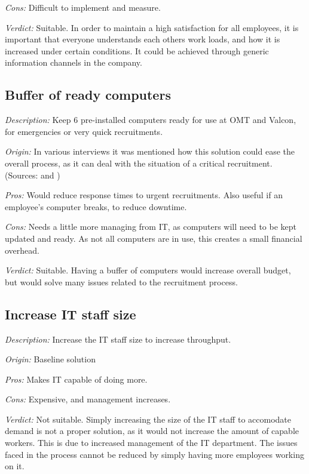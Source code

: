 \noindent \emph{Cons:} Difficult to implement and measure. 

\emph{Verdict:}
Suitable. In order to maintain a high satisfaction for all employees, it is important that everyone understands each others work loads, and how it is increased under certain conditions. It could be achieved through generic information channels in the company.

\subsection{Buffer of ready computers}
\emph{Description:} Keep 6 pre-installed computers ready for use at OMT and Valcon, for emergencies or very quick recruitments.

\emph{Origin:}
In various interviews it was mentioned how this solution could ease the overall process, as it can deal with the situation of a critical recruitment.
(Sources:  and )

\noindent \emph{Pros:} Would reduce response times to urgent recruitments.
Also useful if an employee's computer breaks, to reduce downtime.

\noindent \emph{Cons:} Needs a little more managing from IT, as
computers will need to be kept updated and ready.
As not all computers are in use, this creates a small financial overhead.

\emph{Verdict:}
Suitable. Having a buffer of computers would increase overall budget, but would solve many issues related to the recruitment process.

\subsection{Increase IT staff size}
\emph{Description:} Increase the IT staff size to increase throughput.

\emph{Origin:}
Baseline solution

\noindent \emph{Pros:} Makes IT capable of doing more.

\noindent \emph{Cons:} Expensive, and management increases.

\emph{Verdict:}
Not suitable. Simply increasing the size of the IT staff to accomodate demand is not a proper solution, as it would not increase the amount of capable workers. This is due to increased management of the IT department. The issues faced in the process cannot be reduced by simply having more employees working on it.

